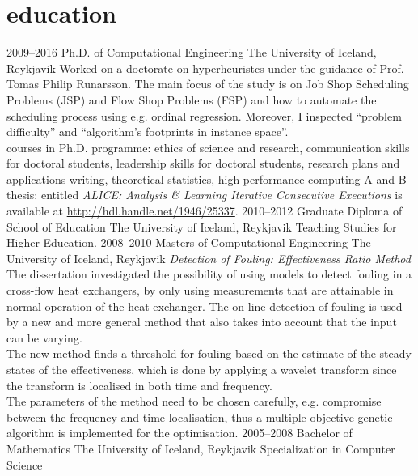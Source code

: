 \documentclass[]{cv} %
\begin{document}
\section{education}
\begin{entrylist}
\entry
{2009--2016}
{Ph.D. {\normalfont of Computational Engineering}}
{The University of Iceland, Reykjavik}
{Worked on a doctorate on hyperheuristcs under the guidance of Prof. Tomas 
Philip Runarsson. The main focus of the study is on Job Shop Scheduling 
Problems (JSP) and Flow Shop Problems (FSP) and how to automate the scheduling 
process using e.g. ordinal regression. Moreover, I inspected ``problem 
difficulty'' and ``algorithm's footprints in instance space''. \\
{\boldfont courses in Ph.D. programme:} 
ethics of science and research, communication skills for doctoral students, leadership skills for doctoral students, research plans and applications writing, theoretical statistics, high performance computing A and B  \\
{\boldfont thesis:} entitled \emph{ALICE: Analysis \& Learning Iterative 
Consecutive Executions} is available at \url{http://hdl.handle.net/1946/25337}.}
\entry
{2010--2012}
{Graduate Diploma {\normalfont of School of Education}}
{The University of Iceland, Reykjavik}
{Teaching Studies for Higher Education.}
\entry
{2008--2010}
{Masters {\normalfont of Computational Engineering}}
{The University of Iceland, Reykjavik}
{\emph{Detection of Fouling: Effectiveness Ratio Method} \\ 
The dissertation investigated the possibility of using models to detect fouling in a cross-flow heat exchangers, by only using measurements that are attainable in normal operation of the heat exchanger.  The on-line detection of fouling is used by a new and more general method that also takes into account that the input can be varying. \\
The new method finds a threshold for fouling based on the estimate of the steady states of the effectiveness, which is done by applying a wavelet transform since the transform is localised in both time and frequency. \\
The parameters of the method need to be chosen carefully, e.g. compromise between the frequency and time localisation, thus a multiple objective genetic algorithm is implemented for the optimisation. }
\entry
{2005--2008}
{Bachelor {\normalfont of Mathematics}}
{The University of Iceland, Reykjavik}
{Specialization in Computer Science}
\end{entrylist}
\end{document}
